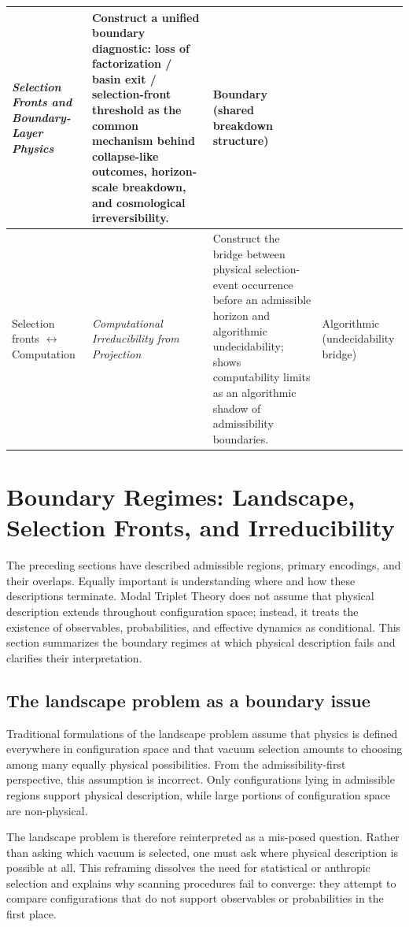 \documentclass[11pt]{article}
\begin{document}
\begin{center}
\begin{tabular}{|p{3.8cm}|p{4.6cm}|p{5.0cm}|p{3.2cm}|}
\emph{Selection Fronts and Boundary-Layer Physics} &
Construct a unified boundary diagnostic: loss of factorization / basin exit / selection-front threshold
as the common mechanism behind collapse-like outcomes, horizon-scale breakdown, and cosmological irreversibility. &
Boundary (shared breakdown structure) \\
\hline
Selection fronts $\leftrightarrow$ Computation &
\emph{Computational Irreducibility from Projection} &
Construct the bridge between physical selection-event occurrence before an admissible horizon and
algorithmic undecidability; shows computability limits as an algorithmic shadow of admissibility boundaries. &
Algorithmic (undecidability bridge) \\
\hline
\end{tabular}
\end{center}


\section{Boundary Regimes: Landscape, Selection Fronts, and Irreducibility}

The preceding sections have described admissible regions, primary encodings, and their overlaps. Equally important is understanding where and how these descriptions terminate. Modal Triplet Theory does not assume that physical description extends throughout configuration space; instead, it treats the existence of observables, probabilities, and effective dynamics as conditional. This section summarizes the boundary regimes at which physical description fails and clarifies their interpretation.

\subsection{The landscape problem as a boundary issue}

Traditional formulations of the landscape problem assume that physics is defined everywhere in configuration space and that vacuum selection amounts to choosing among many equally physical possibilities. From the admissibility-first perspective, this assumption is incorrect. Only configurations lying in admissible regions support physical description, while large portions of configuration space are non-physical.

The landscape problem is therefore reinterpreted as a mis-posed question. Rather than asking which vacuum is selected, one must ask where physical description is possible at all. This reframing dissolves the need for statistical or anthropic selection and explains why scanning procedures fail to converge: they attempt to compare configurations that do not support observables or probabilities in the first place.
\end{document}
